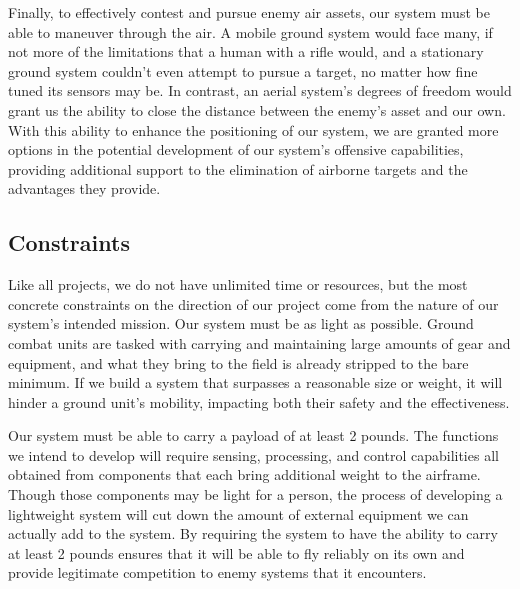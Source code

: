 \documentclass[10pt]{article}
\begin{document}
Finally, to effectively contest and pursue enemy air assets, our system must be able to maneuver through the air. A mobile ground system would face many, if not more of the limitations that a human with a rifle would, and a stationary ground system couldn’t even attempt to pursue a target, no matter how fine tuned its sensors may be. In contrast, an aerial system’s degrees of freedom would grant us the ability to close the distance between the enemy’s asset and our own. With this ability to enhance the positioning of our system, we are granted more options in the potential development of our system’s offensive capabilities, providing additional support to the elimination of airborne targets and the advantages they provide.

\subsection{Constraints}
Like all projects, we do not have unlimited time or resources, but the most concrete constraints on the direction of our project come from the nature of our system’s intended mission. Our system must be as light as possible. Ground combat units are tasked with carrying and maintaining large amounts of gear and equipment, and what they bring to the field is already stripped to the bare minimum. If we build a system that surpasses a reasonable size or weight, it will hinder a ground unit’s mobility, impacting both their safety and the effectiveness. 

Our system must be able to carry a payload of at least 2 pounds. The functions we intend to develop will require sensing, processing, and control capabilities all obtained from components that each bring additional weight to the airframe. Though those components may be light for a person, the process of developing a lightweight system will cut down the amount of external equipment we can actually add to the system. By requiring the system to have the ability to carry at least 2 pounds ensures that it will be able to fly reliably on its own and provide legitimate competition to enemy systems that it encounters.
\end{document}
